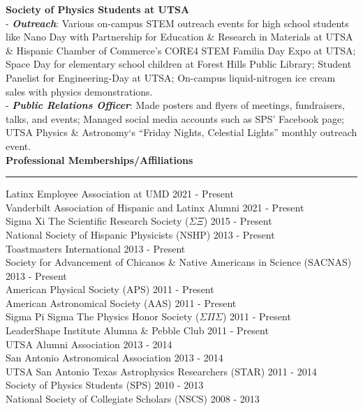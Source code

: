 \documentclass[letter,11pt]{article}
\begin{document}
\vskip 0.01in
\noindent
\textbf{Society of Physics Students at UTSA} \\
- \textbf{\textit{Outreach}}: Various on-campus STEM outreach events for high school students like Nano Day with Partnership for Education \& Research in Materials at UTSA \& Hispanic Chamber of Commerce’s CORE4 STEM Familia Day Expo at UTSA; Space Day for elementary school children at Forest Hills Public Library; Student Panelist for Engineering-Day at UTSA; On-campus liquid-nitrogen ice cream sales with physics demonstrations. \\
- \textbf{\textit{Public Relations Officer}}: Made posters and flyers of meetings, fundraisers, talks, and events; Managed social media accounts such as SPS’ Facebook page; UTSA Physics \& Astronomy`s “Friday Nights, Celestial Lights” monthly outreach event. \\


\noindent
{\bf Professional Memberships/Affiliations} \\
\vspace{-10mm}
\begin{center}
\rule{\textwidth}{0.2mm}
\end{center}
\vspace{-3mm}
{ 
\small \noindent Latinx Employee Association at UMD \hfill 2021 - Present \\
Vanderbilt Association of Hispanic and Latinx Alumni \hfill 2021 - Present \\
Sigma Xi \text{\textbar} The Scientific Research Society ($\Sigma \Xi$) \hfill 2015 - Present \\
National Society of Hispanic Physicists (NSHP) \hfill 2013 - Present \\
Toastmasters International \hfill 2013 - Present \\
Society for Advancement of Chicanos \& Native Americans in Science (SACNAS) \hfill 2013 - Present  \\
American Physical Society (APS) \hfill 2011 - Present \\
American Astronomical Society (AAS) \hfill 2011 - Present \\
Sigma Pi Sigma \text{\textbar} The Physics Honor Society ($\Sigma \Pi \Sigma$) \hfill 2011 - Present \\
LeaderShape Institute Alumna \& Pebble Club \hfill 2011 - Present \\
UTSA Alumni Association \hfill 2013 - 2014 \\
San Antonio Astronomical Association \hfill 2013 - 2014 \\
UTSA San Antonio Texas Astrophysics Researchers (STAR) \hfill 2011 - 2014 \\
Society of Physics Students (SPS) \hfill 2010 - 2013 \\
National Society of Collegiate Scholars (NSCS) \hfill 2008 - 2013 \\
}
\end{document}
